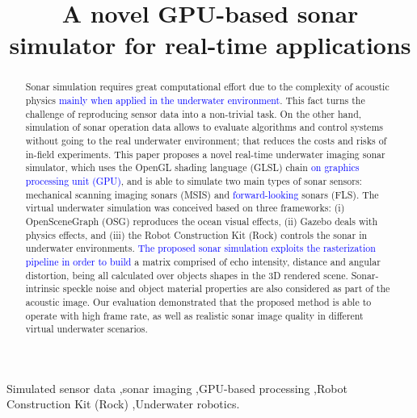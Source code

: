 \documentclass[final,5p,times]{elsarticle}
\begin{document}
\begin{frontmatter}


\title{A novel GPU-based sonar simulator for real-time applications}



\begin{abstract}

Sonar simulation requires great computational effort due to the complexity of
acoustic physics \textcolor{blue}{mainly when applied in the underwater environment}.
This fact turns the challenge of reproducing sensor data into a non-trivial task. On the other
hand, simulation of sonar operation data allows to evaluate algorithms and
control systems without going to the real underwater environment; that reduces
the costs and risks of in-field experiments. This paper proposes a novel
real-time underwater imaging sonar simulator, which uses the OpenGL shading
language (GLSL) chain \textcolor{blue}{on graphics processing unit (GPU)}, and is able to
simulate two main types of sonar sensors: mechanical scanning imaging sonars
(MSIS) and \textcolor{blue}{forward-looking} sonars (FLS). The virtual underwater simulation was
conceived based on three frameworks: (i) OpenSceneGraph (OSG) reproduces the
ocean visual effects, (ii) Gazebo deals with physics effects, and (iii) the
Robot Construction Kit (Rock) controls the sonar in underwater environments.
\textcolor{blue}{The proposed sonar simulation exploits the rasterization pipeline in order
to build} a matrix comprised of echo intensity, distance and angular distortion,
being all calculated over objects shapes in the 3D rendered scene.
Sonar-intrinsic speckle noise and object material properties are also
considered as part of the acoustic image. Our evaluation demonstrated that the
proposed method is able to operate with high frame rate, as well as realistic
sonar image quality in different virtual underwater scenarios.

\end{abstract}

\begin{keyword}
Simulated sensor data
\sep sonar imaging
\sep GPU-based processing
\sep Robot Construction Kit (Rock)
\sep Underwater robotics.

\end{keyword}

\end{frontmatter}
\end{document}
